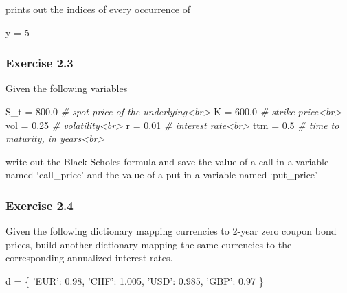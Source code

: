 \documentclass[11pt]{article}
\newenvironment{Shaded}{}{}
\newcommand{\DecValTok}[1]{\textcolor[rgb]{0.25,0.63,0.44}{{#1}}}
\newcommand{\FloatTok}[1]{\textcolor[rgb]{0.25,0.63,0.44}{{#1}}}
\newcommand{\StringTok}[1]{\textcolor[rgb]{0.25,0.44,0.63}{{#1}}}
\newcommand{\CommentTok}[1]{\textcolor[rgb]{0.38,0.63,0.69}{\textit{{#1}}}}
\newcommand{\NormalTok}[1]{{#1}}
\newcommand{\OperatorTok}[1]{\textcolor[rgb]{0.40,0.40,0.40}{{#1}}}
\begin{document}
prints out the indices of every occurrence of

\begin{Shaded}
\begin{Highlighting}[]
\NormalTok{y }\OperatorTok{=} \DecValTok{5}
\end{Highlighting}
\end{Shaded}

\hypertarget{exercise-2.3}{%
\subsubsection{Exercise 2.3}\label{exercise-2.3}}

Given the following variables

\begin{Shaded}
\begin{Highlighting}[]
\NormalTok{S_t }\OperatorTok{=} \FloatTok{800.0} \CommentTok{# spot price of the underlying<br>}
\NormalTok{K }\OperatorTok{=} \FloatTok{600.0}   \CommentTok{# strike price<br>}
\NormalTok{vol }\OperatorTok{=} \FloatTok{0.25}  \CommentTok{# volatility<br>}
\NormalTok{r }\OperatorTok{=} \FloatTok{0.01}    \CommentTok{# interest rate<br>}
\NormalTok{ttm }\OperatorTok{=} \FloatTok{0.5}   \CommentTok{# time to maturity, in years<br>}
\end{Highlighting}
\end{Shaded}

write out the Black Scholes formula and save the value of a call in a
variable named `call\_price' and the value of a put in a variable named
`put\_price'

\hypertarget{exercise-2.4}{%
\subsubsection{Exercise 2.4}\label{exercise-2.4}}

Given the following dictionary mapping currencies to 2-year zero coupon
bond prices, build another dictionary mapping the same currencies to the
corresponding annualized interest rates.

\begin{Shaded}
\begin{Highlighting}[]
\NormalTok{d }\OperatorTok{=}\NormalTok{ \{}
\StringTok{'EUR'}\NormalTok{: }\FloatTok{0.98}\NormalTok{,}
\StringTok{'CHF'}\NormalTok{: }\FloatTok{1.005}\NormalTok{,}
\StringTok{'USD'}\NormalTok{: }\FloatTok{0.985}\NormalTok{,}
\StringTok{'GBP'}\NormalTok{: }\FloatTok{0.97}
\NormalTok{\}}
\end{Highlighting}
\end{Shaded}
\end{document}
